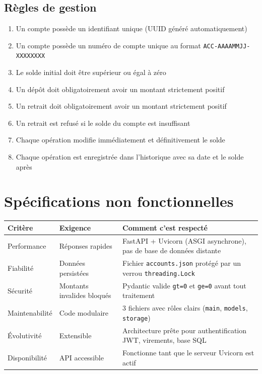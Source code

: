 \documentclass[12pt,a4paper]{article}
\begin{document}
\subsection{Règles de gestion}

\begin{enumerate}[noitemsep]
  \item Un compte possède un identifiant unique (UUID généré automatiquement)
  \item Un compte possède un numéro de compte unique au format \texttt{ACC-AAAAMMJJ-XXXXXXXX}
  \item Le solde initial doit être supérieur ou égal à zéro
  \item Un dépôt doit obligatoirement avoir un montant strictement positif
  \item Un retrait doit obligatoirement avoir un montant strictement positif
  \item Un retrait est refusé si le solde du compte est insuffisant
  \item Chaque opération modifie immédiatement et définitivement le solde
  \item Chaque opération est enregistrée dans l'historique avec sa date et le solde après
\end{enumerate}

\section{Spécifications non fonctionnelles}

\begin{center}
\begin{tabular}{lp{4.5cm}p{6cm}}
\toprule
\textbf{Critère} & \textbf{Exigence} & \textbf{Comment c'est respecté} \\
\midrule
Performance & Réponses rapides & FastAPI + Uvicorn (ASGI asynchrone), pas de base de données distante \\
Fiabilité & Données persistées & Fichier \texttt{accounts.json} protégé par un verrou \texttt{threading.Lock} \\
Sécurité & Montants invalides bloqués & Pydantic valide \texttt{gt=0} et \texttt{ge=0} avant tout traitement \\
Maintenabilité & Code modulaire & 3 fichiers avec rôles clairs (\texttt{main}, \texttt{models}, \texttt{storage}) \\
Évolutivité & Extensible & Architecture prête pour authentification JWT, virements, base SQL \\
Disponibilité & API accessible & Fonctionne tant que le serveur Uvicorn est actif \\
\bottomrule
\end{tabular}
\end{center}
\end{document}
